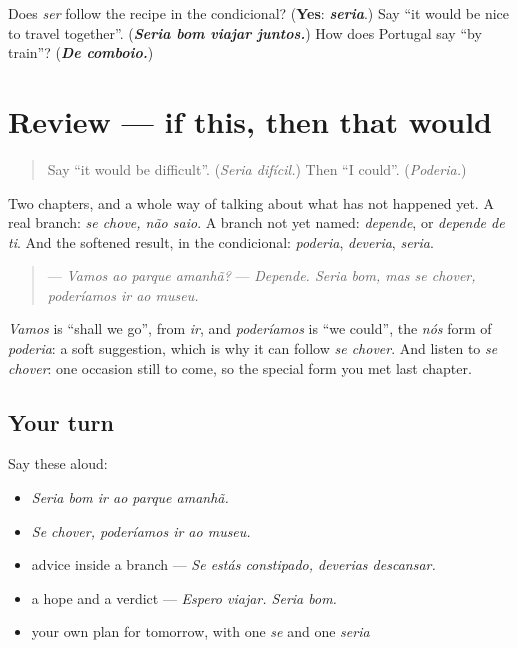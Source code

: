 \begin{tcolorbox}[breakable,colback=teal!4,colframe=teal!35!black,title={Before you move on}]
Does \emph{ser} follow the recipe in the condicional? (\textbf{Yes}: \emph{\textbf{seria}}.) Say \textquotedblleft{}it would be nice to travel together\textquotedblright{}. (\emph{\textbf{Seria bom viajar juntos.}}) How does Portugal say \textquotedblleft{}by train\textquotedblright{}? (\emph{\textbf{De comboio.}})
\end{tcolorbox}
\section[(review)]{Review — if this, then that would}

\label{lesson:PT-C268-revisao-condicional}



\begin{quote}
Say \textquotedblleft{}it would be difficult\textquotedblright{}. (\emph{Seria difícil.}) Then \textquotedblleft{}I could\textquotedblright{}. (\emph{Poderia.})
\end{quote}

\begin{grammarlens}[title={What you've built}]
Two chapters, and a whole way of talking about what has not happened yet. A real branch: \emph{se chove, não saio}. A branch not yet named: \emph{depende}, or \emph{depende de ti}. And the softened result, in the condicional: \emph{poderia}, \emph{deveria}, \emph{seria}.

\begin{quote}
— \emph{Vamos ao parque amanhã?} — \emph{Depende. Seria bom, mas se chover, poderíamos ir ao museu.}
\end{quote}

\emph{Vamos} is \textquotedblleft{}shall we go\textquotedblright{}, from \emph{ir}, and \emph{poderíamos} is \textquotedblleft{}we could\textquotedblright{}, the \emph{nós} form of \emph{poderia}: a soft suggestion, which is why it can follow \emph{se chover}. And listen to \emph{se chover}: one occasion still to come, so the special form you met last chapter.
\end{grammarlens}

\subsection*{Your turn}
Say these aloud:

\begin{itemize}
\raggedright
  \item \emph{Seria bom ir ao parque amanhã.}
  \item \emph{Se chover, poderíamos ir ao museu.}
  \item advice inside a branch — \emph{Se estás constipado, deverias descansar.}
  \item a hope and a verdict — \emph{Espero viajar. Seria bom.}
  \item your own plan for tomorrow, with one \emph{se} and one \emph{seria}
\end{itemize}

